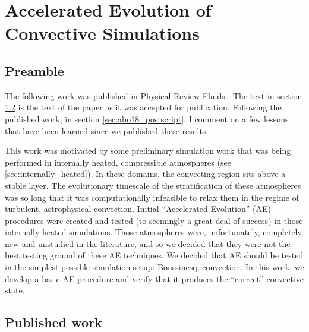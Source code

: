 \chapter{Accelerated Evolution of Convective Simulations}
\label{ch:abo18}

\section{Preamble}
The following work was published in Physical Review Fluids \citep{anders&all2018}.
The text in section \ref{sec:abo18_published} is the text of the paper as it was accepted for publication.
Following the published work, in section \ref{sec:abo18_postscript}, I comment on a few lessons that have been learned since we published these results.

This work was motivated by some preliminary simulation work that was being performed in internally heated, compressible atmospheres (see \ref{sec:internally_heated}).
In these domains, the convecting region sits above a stable layer.
The evolutionary timescale of the stratification of these atmospheres was so long that it was computationally infeasible to relax them in the regime of turbulent, astrophysical convection.
Initial ``Accelerated Evolution'' (AE) procedures were created and tested (to seemingly a great deal of success) in those internally heated simulations.
Those atmospheres were, unfortunately, completely new and unstudied in the literature, and so we decided that they were not the best testing ground of these AE techniques.
We decided that AE should be tested in the simplest possible simulation setup: Boussinesq, \RB convection.
In this work, we develop a basic AE procedure and verify that it produces the ``correct'' convective state.

\section{Published work}
\label{sec:abo18_published}

